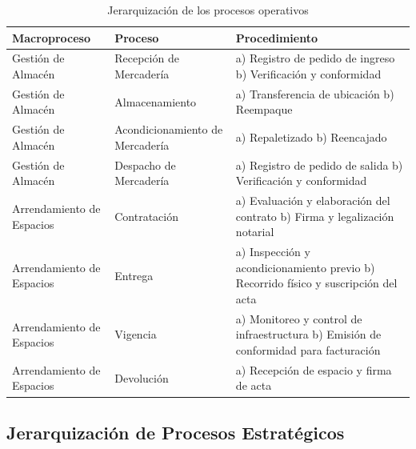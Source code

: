 \documentclass[11pt, a4paper, oneside]{report}
\begin{document}
\begin{table}[H]
\centering\small
\renewcommand{\arraystretch}{1.3}
\begin{tabularx}{\textwidth}{|>{\raggedright\arraybackslash}p{}|>{\raggedright\arraybackslash}p{}|>{\raggedright\arraybackslash}X|}
\hline
\rowcolor{upeu_dark}
\color{white}\bfseries Macroproceso & \color{white}\bfseries Proceso & \color{white}\bfseries Procedimiento \\ \hline
Gestión de Almacén & Recepción de Mercadería & a) Registro de pedido de ingreso \newline b) Verificación y conformidad \\ \hline
\rowcolor{gray!10}
Gestión de Almacén & Almacenamiento & a) Transferencia de ubicación \newline b) Reempaque \\ \hline
Gestión de Almacén & Acondicionamiento de Mercadería & a) Repaletizado \newline b) Reencajado \\ \hline
\rowcolor{gray!10}
Gestión de Almacén & Despacho de Mercadería & a) Registro de pedido de salida \newline b) Verificación y conformidad \\ \hline
Arrendamiento de Espacios & Contratación & a) Evaluación y elaboración del contrato \newline b) Firma y legalización notarial \\ \hline
\rowcolor{gray!10}
Arrendamiento de Espacios & Entrega & a) Inspección y acondicionamiento previo \newline b) Recorrido físico y suscripción del acta \\ \hline
Arrendamiento de Espacios & Vigencia & a) Monitoreo y control de infraestructura \newline b) Emisión de conformidad para facturación \\ \hline
\rowcolor{gray!10}
Arrendamiento de Espacios & Devolución & a) Recepción de espacio y firma de acta \\ \hline
\end{tabularx}
\caption{Jerarquización de los procesos operativos}
\end{table}

\subsection{Jerarquización de Procesos Estratégicos}
\end{document}
